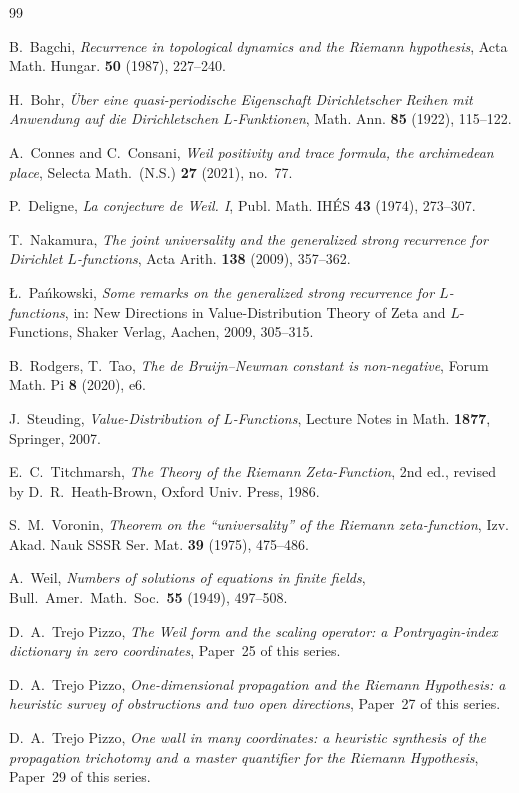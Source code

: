 \documentclass[11pt]{amsart}
\theoremstyle{definition}
\theoremstyle{remark}
\begin{document}
\begin{thebibliography}{99}

 B.~Bagchi, \emph{Recurrence in topological dynamics and
the Riemann hypothesis}, Acta Math. Hungar. \textbf{50} (1987), 227--240.

 H.~Bohr, \emph{\"Uber eine quasi-periodische Eigenschaft
Dirichletscher Reihen mit Anwendung auf die Dirichletschen $L$-Funktionen},
Math. Ann. \textbf{85} (1922), 115--122.

 A.~Connes and C.~Consani, \emph{Weil positivity and trace
formula, the archimedean place}, Selecta Math.\ (N.S.) \textbf{27} (2021),
no.~77.

 P.~Deligne, \emph{La conjecture de Weil. I},
Publ. Math. IH\'ES \textbf{43} (1974), 273--307.

 T.~Nakamura, \emph{The joint universality and the
generalized strong recurrence for Dirichlet $L$-functions}, Acta Arith.
\textbf{138} (2009), 357--362.

 \L.~Pa\'nkowski, \emph{Some remarks on the generalized
strong recurrence for $L$-functions}, in: New Directions in
Value-Distribution Theory of Zeta and $L$-Functions, Shaker Verlag, Aachen,
2009, 305--315.

 B.~Rodgers, T.~Tao, \emph{The de Bruijn--Newman constant is
non-negative}, Forum Math. Pi \textbf{8} (2020), e6.

 J.~Steuding, \emph{Value-Distribution of $L$-Functions},
Lecture Notes in Math. \textbf{1877}, Springer, 2007.

 E.~C.~Titchmarsh, \emph{The Theory of the Riemann
Zeta-Function}, 2nd ed., revised by D.~R.~Heath-Brown, Oxford Univ. Press,
1986.

 S.~M.~Voronin, \emph{Theorem on the ``universality'' of
the Riemann zeta-function}, Izv. Akad. Nauk SSSR Ser. Mat. \textbf{39}
(1975), 475--486.

 A.~Weil, \emph{Numbers of solutions of equations in finite
fields}, Bull.\ Amer.\ Math.\ Soc.\ \textbf{55} (1949), 497--508.

 D.~A.~Trejo Pizzo, \emph{The Weil form and the scaling
operator: a Pontryagin-index dictionary in zero coordinates}, Paper~25 of
this series.

 D.~A.~Trejo Pizzo, \emph{One-dimensional propagation and the
Riemann Hypothesis: a heuristic survey of obstructions and two open
directions}, Paper~27 of this series.

 D.~A.~Trejo Pizzo, \emph{One wall in many coordinates: a
heuristic synthesis of the propagation trichotomy and a master quantifier
for the Riemann Hypothesis}, Paper~29 of this series.

\end{thebibliography}
\end{document}
